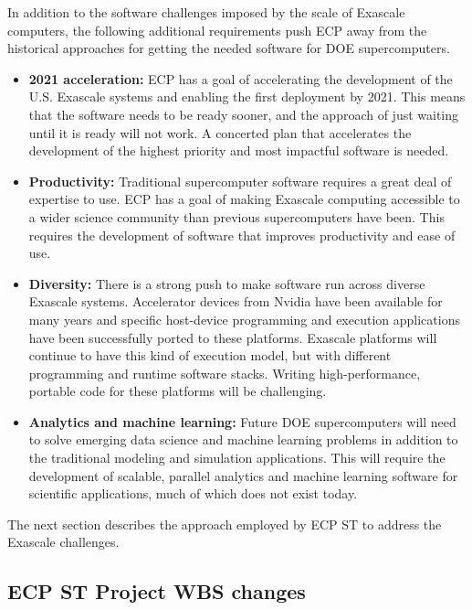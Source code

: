 In addition to the software challenges imposed by the scale of Exascale computers, the following additional requirements push ECP away from the historical approaches for getting the needed software for DOE supercomputers.
\begin{itemize}
\item \textbf{2021 acceleration:} ECP has a goal of accelerating the development of the U.S. Exascale systems and enabling the first deployment by 2021. This means that the software needs to be ready sooner, and the approach of just waiting until it is ready will not work. A concerted plan that accelerates the development of the highest priority and most impactful software is needed.
\item \textbf{Productivity:} Traditional supercomputer software requires a great deal of expertise to use. ECP has a goal of making Exascale computing accessible to a wider science community than previous supercomputers have been. This requires the development of software that improves productivity and ease of use.
\item \textbf{Diversity:} There is a strong push to make software run across diverse Exascale systems. Accelerator devices from Nvidia have been available for many years and specific host-device programming and execution applications have been successfully ported to these platforms.  Exascale platforms will continue to have this kind of execution model, but with different programming and runtime software stacks.  Writing high-performance, portable code for these platforms will be challenging.
\item \textbf{Analytics and machine learning:} Future DOE supercomputers will need to solve emerging data science and machine learning problems in addition to the traditional modeling and simulation applications. This will require the development of scalable, parallel analytics and machine learning software for scientific applications, much of which does not exist today.
\end{itemize}
 
The next section describes the approach employed by ECP ST to address the Exascale challenges.

\subsection{ECP ST Project WBS changes}\label{subsect:ProjectRestructuring}

